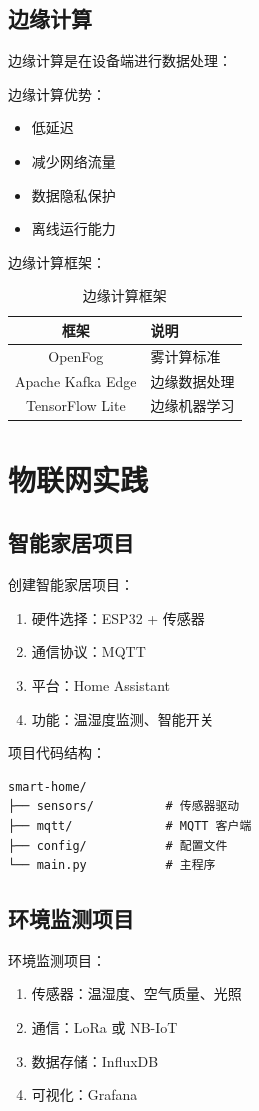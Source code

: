 \documentclass[12pt,UTF8]{ctexbook}
\begin{document}
\section{边缘计算}
\label{sec:edge_computing}

边缘计算是在设备端进行数据处理：

边缘计算优势：
\begin{itemize}
    \item 低延迟
    \item 减少网络流量
    \item 数据隐私保护
    \item 离线运行能力
\end{itemize}

边缘计算框架：
\begin{table}[htbp]
    \centering
    \caption{边缘计算框架}
    \begin{tabular}{|c|p{8cm}|}
        \hline
        \textbf{框架} & \textbf{说明} \\
        \hline
        OpenFog & 雾计算标准 \\
        \hline
        Apache Kafka Edge & 边缘数据处理 \\
        \hline
        TensorFlow Lite & 边缘机器学习 \\
        \hline
    \end{tabular}
\end{table}

\chapter{物联网实践}
\label{chap:practice}

\section{智能家居项目}
\label{sec:smart_home_project}

创建智能家居项目：
\begin{enumerate}
    \item 硬件选择：ESP32 + 传感器
    \item 通信协议：MQTT
    \item 平台：Home Assistant
    \item 功能：温湿度监测、智能开关
\end{enumerate}

项目代码结构：
\begin{verbatim}
smart-home/
├── sensors/          # 传感器驱动
├── mqtt/             # MQTT 客户端
├── config/           # 配置文件
└── main.py           # 主程序
\end{verbatim}

\section{环境监测项目}
\label{sec:environmental_monitoring}

环境监测项目：
\begin{enumerate}
    \item 传感器：温湿度、空气质量、光照
    \item 通信：LoRa 或 NB-IoT
    \item 数据存储：InfluxDB
    \item 可视化：Grafana
\end{enumerate}

\backmatter
\end{document}

